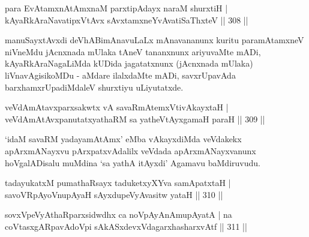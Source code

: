 \begin{shl}
para EvA\s \s tamxnA\s \s tAmxnaM parxtipAdayx naraM shurxtiH |
kAyaRkAraNavatipxVtAvx sAvxtamxneYvAvatiSaThxteV \hfill || 308 ||
\end{shl}

\begin{artha}
manuSayxtAvxdi deVhABimAnavuLaLx mAnavananunx kuritu paramAtamxneV niVneMdu jAcnxnada mUlaka tAneV tananxnunx ariyuvaMte mADi, kAyaRkAraNagaLiMda \-kUDida jagatatxnunx (jAcnxnada mUlaka) liVnavAgisikoMDu - aMdare ilalxdaMte mADi, \-savxrUpavAda barxhamxrUpadiMdaleV shurxtiyu uLiyutatxde.
\end{artha}


\begin{shl}
veVdAmAtavxparxsakwtx vA savaRmAtemxVtivAkayxtaH |
veVdAmAtAvxpanutatxyathaRM sa yatheVtAyxgamaH paraH \hfill || 309 ||
\end{shl}

\begin{artha}
`idaM savaRM yadayamAtAmx' eMba vAkayxdiMda veVdakekx apArxmANayxvu pArxpatxvAdalilx veVdada apArxmANayxvanunx hoVgalADisalu muMdina `sa yathA itAyxdi' Agamavu baMdiruvudu.
\end{artha}

\begin{shl}
tadayukatxM pumathaRsayx taduketxyXYva samApatxtaH |
savoVRpAyoV\s nupAyaH sAyxdupeVyAvasitw yataH \hfill || 310 ||
\end{shl}
\begin{shl}
sovxVpeVyAthaRparxsidwdhx ca noVpAyAnAmupAyatA |
na coVtasxgARpavAdoV\s pi sAkASxdevxVdagarxhasharxvAtf \hfill || 311 ||
\end{shl}

